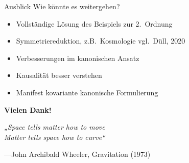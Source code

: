 \documentclass{beamer}
\begin{document}
    \begin{frame}{Ausblick}
        Wie könnte es weitergehen?
        \begin{itemize}
            \item Vollständige Lösung des Beispiels zur 2.\ Ordnung
            \item Symmetriereduktion, z.B.\ Kosmologie {\scriptsize \lbrack vgl.\ Düll, 2020\rbrack}
            \item Verbesserungen im kanonischen Ansatz
            \item Kausalität besser verstehen
            \item Manifest kovariante kanonische Formulierung
        \end{itemize}
    \end{frame}

    \begin{frame}{}

        \begin{center}
            \Huge\alert{\textbf{Vielen Dank!}}
        \end{center}

        \Large
        \textit{„Space tells matter how to move \\
        Matter tells space how to curve“}

        \normalsize
        ---John Archibald Wheeler, Gravitation (1973)
    \end{frame}
\end{document}
